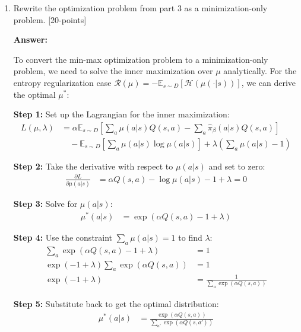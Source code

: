 \documentclass[12pt]{article}
\begin{document}
{{\begin{enumerate}
    \textbf{Overall Mechanism:} The CQL objective learns Q-values that are conservative (low for OOD actions) but accurate (correct for in-distribution actions). The first two terms create a gap between Q-values for dataset actions and potentially OOD actions, while the entropy term ensures broad coverage, and the Bellman term maintains accuracy.

    \item Rewrite the optimization problem from part 3 as a minimization-only problem. [20-points]
    
    \textbf{Answer:}
    
    To convert the min-max optimization problem to a minimization-only problem, we need to solve the inner maximization over $\mu$ analytically. For the entropy regularization case $\mathcal{R}(\mu) = -\mathbb{E}_{s \sim D} [\mathcal{H}(\mu(\cdot|s))]$, we can derive the optimal $\mu^*$:
    
    \textbf{Step 1:} Set up the Lagrangian for the inner maximization:
    \begin{align}
    L(\mu, \lambda) &= \alpha \mathbb{E}_{s \sim D} \left[ \sum_a \mu(a|s) Q(s,a) - \sum_a \hat{\pi}_{\beta}(a|s) Q(s,a) \right] \\
    &\quad - \mathbb{E}_{s \sim D} \left[ \sum_a \mu(a|s) \log \mu(a|s) \right] + \lambda \left( \sum_a \mu(a|s) - 1 \right)
    \end{align}
    
    \textbf{Step 2:} Take the derivative with respect to $\mu(a|s)$ and set to zero:
    \begin{align}
    \frac{\partial L}{\partial \mu(a|s)} &= \alpha Q(s,a) - \log \mu(a|s) - 1 + \lambda = 0
    \end{align}
    
    \textbf{Step 3:} Solve for $\mu(a|s)$:
    \begin{align}
    \mu^*(a|s) &= \exp(\alpha Q(s,a) - 1 + \lambda)
    \end{align}
    
    \textbf{Step 4:} Use the constraint $\sum_a \mu(a|s) = 1$ to find $\lambda$:
    \begin{align}
    \sum_a \exp(\alpha Q(s,a) - 1 + \lambda) &= 1 \\
    \exp(-1 + \lambda) \sum_a \exp(\alpha Q(s,a)) &= 1 \\
    \exp(-1 + \lambda) &= \frac{1}{\sum_a \exp(\alpha Q(s,a))}
    \end{align}
    
    \textbf{Step 5:} Substitute back to get the optimal distribution:
    \begin{align}
    \mu^*(a|s) &= \frac{\exp(\alpha Q(s,a))}{\sum_{a'} \exp(\alpha Q(s,a'))}
    \end{align}
    

\end{enumerate}}}
\end{document}
